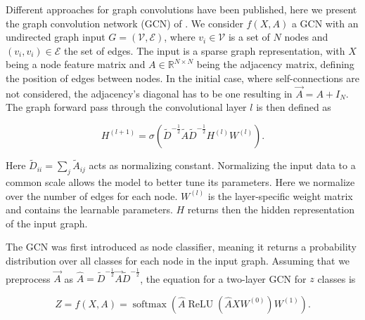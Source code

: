 Different approaches for graph convolutions have been published, here we present the graph convolution network (GCN) of \cite{kipf_semi-supervised_2017}.
We consider $f(X,A)$ a GCN with an undirected graph input ${G}=(\mathcal{V}, \mathcal{E})$, where $v_{i} \in \mathcal{V}$ is a set of $N$ nodes and  $\left(v_{i}, v_{i}\right) \in \mathcal{E}$ the set of edges. The input is a sparse graph representation, with $X$ being a node feature matrix and $A \in \mathbb{R}^{N \times N}$ being the adjacency matrix, defining the position of edges between nodes. In the initial case, where self-connections are not considered, the adjacency's diagonal has to be one resulting in $\vec{A}=A+I_{N}$. The graph forward pass through the convolutional layer $l$ is then defined as

\begin{equation}
    H^{(l+1)}=\sigma\left(\tilde{D}^{-\frac{1}{2}} \tilde{A} \tilde{D}^{-\frac{1}{2}} H^{(l)} W^{(l)}\right).
\end{equation}

Here $\tilde{D}_{i i}=\sum_{j} \tilde{A}_{i j}$ acts as normalizing constant. Normalizing the input data to a common scale allows the model to better tune its parameters. Here we normalize over the number of edges for each node. $W^{(l)}$ is the layer-specific weight matrix and contains the learnable parameters. $H$ returns then the hidden representation of the input graph.

The GCN was first introduced as node classifier, meaning it returns a probability distribution over all classes for each node in the input graph. Assuming that we preprocess $\vec{A}$ as $\hat{A}=\tilde{D}^{-\frac{1}{2}} \vec{A} \tilde{D}^{-\frac{1}{2}}$, the equation for a two-layer GCN for $z$ classes is

\begin{equation}
    Z=f(X, A)=\operatorname{softmax}\left(\hat{A} \operatorname{ReLU}\left(\hat{A} X W^{(0)}\right) W^{(1)}\right).
\end{equation}




